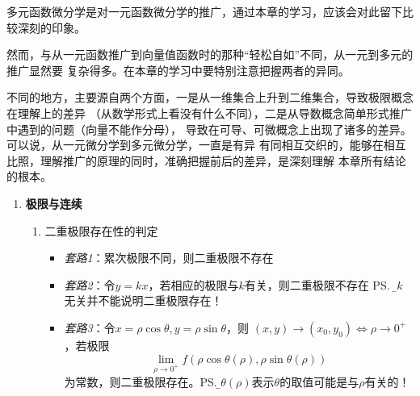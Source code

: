 多元函数微分学是对一元函数微分学的推广，通过本章的学习，应该会对此留下比较深刻的印象。

然而，与从一元函数推广到向量值函数时的那种“轻松自如”不同，从一元到多元的推广显然要
复杂得多。在本章的学习中要特别注意把握两者的异同。

不同的地方，主要源自两个方面，一是从一维集合上升到二维集合，导致极限概念在理解上的差异
（从数学形式上看没有什么不同），二是从导数概念简单形式推广中遇到的问题（向量不能作分母），
导致在可导、可微概念上出现了诸多的差异。可以说，从一元微分学到多元微分学，一直是有异
有同相互交织的，能够在相互比照，理解推广的原理的同时，准确把握前后的差异，是深刻理解
本章所有结论的根本。

\begin{enumerate}
  \item {\bf 极限与连续}
  \begin{enumerate}[(1)]
    \item 二重极限存在性的判定
    \begin{itemize}
      \item {\it 套路1}：累次极限不同，则二重极限不存在
      \item {\it 套路2}：令$y=kx$，若相应的极限与$k$有关，则二重极限不存在
      \ps{\b 与$k$无关并不能说明二重极限存在！}
      \item {\it 套路3}：令$x=\rho\cos\theta,y=\rho\sin\theta$，则
      $(x,y)\to(x_0,y_0)\Leftrightarrow\rho\to0^+$，若极限
      $$\lim\limits_{\rho\to0^+}f(\rho\cos\theta(\rho),\rho\sin\theta(\rho))$$
      为常数，则二重极限存在。\ps{\b $\theta(\rho)$表示$\theta$的取值可能是与$\rho$有关的！}
      

\end{itemize}
\end{enumerate}
\end{enumerate}
